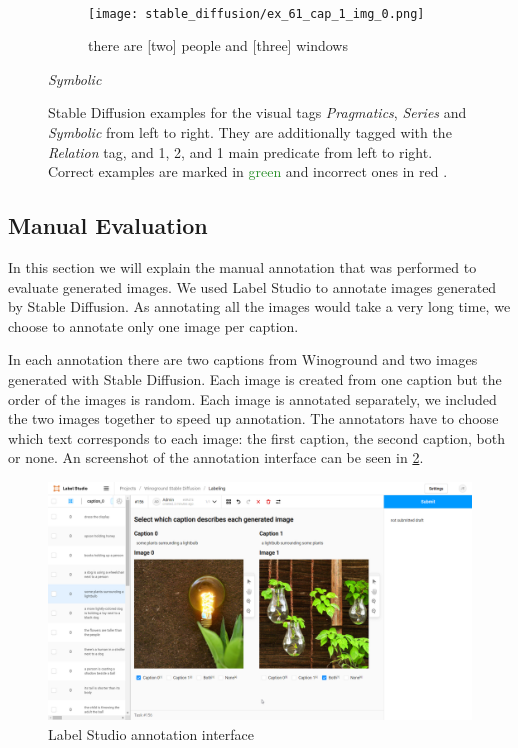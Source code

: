 \begin{figure}[ht]
\begin{minipage}{.30\textwidth}
\begin{subfigure}{\textwidth}
        \end{subfigure}\\
        \begin{subfigure}{\textwidth}
        \centering
        \texttt{[image: stable\_diffusion/ex\_61\_cap\_1\_img\_0.png]}
        \caption{\textcolor{BrickRed}{there are [two] people and [three] windows \xmark}}
        \end{subfigure}%
        \caption*{\textit{Symbolic}}
    \end{minipage}
    \caption{Stable Diffusion examples for the visual tags \textit{Pragmatics}, \textit{Series} and \textit{Symbolic} from left to right. They are additionally tagged with the \textit{Relation} tag, and 1, 2, and 1 main predicate from left to right.  Correct examples are marked in \textcolor{ForestGreen}{green \cmark} and incorrect ones in \textcolor{BrickRed}{red \xmark}.}
    \label{fig:stable-diffusion-examples-visual}
\end{figure}

\subsection{Manual Evaluation} \label{sec:manual_evaluation}

In this section we will explain the manual annotation that was performed to evaluate generated images. We used Label Studio \cite{labelstudio} to annotate images generated by Stable Diffusion. As annotating all the images would take a very long time, we choose to annotate only one image per caption.

In each annotation there are two captions from Winoground and two images generated with Stable Diffusion. Each image is created from one caption but the order of the images is random. Each image is annotated separately, we included the two images together to speed up annotation. The annotators have to choose which text corresponds to each image: the first caption, the second caption, both or none. An screenshot of the annotation interface can be seen in \cref{fig:label-studio-annotation}.

\begin{figure}[ht]
    \centering
    \includegraphics[width=\linewidth]{images/annotation/label-studio-annotation.png}
    \caption{Label Studio annotation interface}
    \label{fig:label-studio-annotation}
\end{figure}


